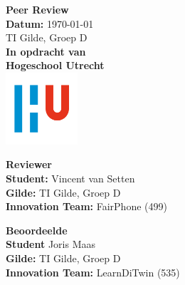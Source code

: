 \documentclass[a4paper]{report}
\begin{document}
\begin{titlepage}
  \begin{center}
      \vspace*{.9cm}
      \Huge
      \textbf{ Peer Review }\\
      \vspace{0.2cm}
      \small \textbf{Datum:} \today \\
      \small TI Gilde, Groep D \\

      \vspace{2cm}
      \normalsize
      \vspace{1cm}
      \Large
      \textbf{In opdracht van}\\
      \large
      \textbf{Hogeschool Utrecht} \\
      \includegraphics[width=0.2\textwidth]{Images/logouni.png}
      \vfill

      \begin{minipage}{0.45\textwidth}
        \large
        \textbf{Reviewer}\\
        \normalsize
        \textbf{Student:} Vincent van Setten \\
        \textbf{Gilde:} TI Gilde, Groep D\\
        \textbf{Innovation Team:} FairPhone (499) \\
        \vspace{2cm}
      \end{minipage}
      \hfill
      \begin{minipage}{0.45\textwidth}
        \large
        \textbf{Beoordeelde}\\
        \normalsize
        \textbf{Student} Joris Maas  \\
        \textbf{Gilde:} TI Gilde, Groep D\\
        \textbf{Innovation Team:} LearnDiTwin (535) \\
        \vspace{2cm}
      \end{minipage}
    \end{center}
\end{titlepage}


\tableofcontents
\end{document}
